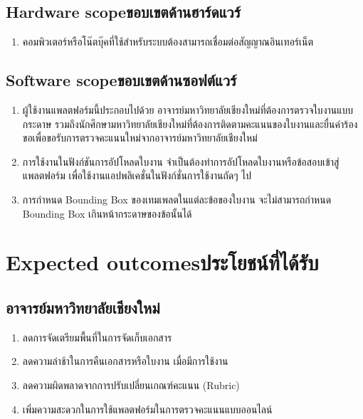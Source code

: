 \subsection{\ifenglish Hardware scope\else ขอบเขตด้านฮาร์ดแวร์\fi}
\begin{enumerate}
    \item คอมพิวเตอร์หรือโน๊ตบุ๊คที่ใช้สำหรับระบบต้องสามารถเชื่อมต่อสัญญาณอินเทอร์เน็ต
\end{enumerate}

\subsection{\ifenglish Software scope\else ขอบเขตด้านซอฟต์แวร์\fi}
\begin{enumerate}
    \item  ผู้ใช้งานแพลตฟอร์มนี้ประกอบไปด้วย อาจารย์มหาวิทยาลัยเชียงใหม่ที่ต้องการตรวจใบงานแบบกระดาษ รวมถึงนักศึกษามหาวิทยาลัยเชียงใหม่ที่ต้องการติดตามคะแนนของใบงานและยื่นคำร้องขอเพื่อขอรับการตรวจคะแนนใหม่จากอาจารย์มหาวิทยาลัยเชียงใหม่ 
    \item การใช้งานในฟังก์ชันการอัปโหลดใบงาน จำเป็นต้องทำการอัปโหลดใบงานหรือข้อสอบเข้าสู่แพลตฟอร์ม เพื่อใช้งานแอปพลิเคชั่นในฟังก์ชั่นการใช้งานถัดๆ ไป 
    \item การกำหนด Bounding Box ของเทมเพลตในแต่ละข้อของใบงาน จะไม่สามารถกำหนด Bounding Box เกินหน้ากระดาษของข้อนั้นได้ 
\end{enumerate}

\section{\ifenglish Expected outcomes\else ประโยชน์ที่ได้รับ\fi}
    \subsection{อาจารย์มหาวิทยาลัยเชียงใหม่}
        \begin{enumerate}
            \renewcommand{\labelenumii}{\theenumi.\arabic{enumii}}
            \item ลดการจัดเตรียมพื้นที่ในการจัดเก็บเอกสาร
            \item ลดความล่าช้าในการคืนเอกสารหรือใบงาน เมื่อมีการใช้งาน
            \item ลดความผิดพลาดจากการปรับเปลี่ยนเกณฑ์คะแนน (Rubric)
            \item เพิ่มความสะดวกในการใช้แพลตฟอร์มในการตรวจคะแนนแบบออนไลน์
        \end{enumerate}

